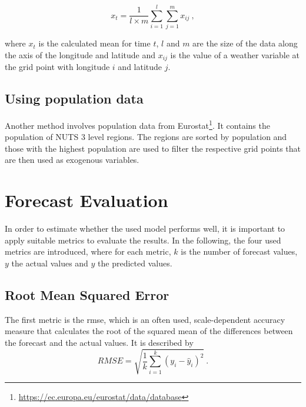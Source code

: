 \begin{equation}
x_t = \frac{1}{l \times m} \sum_{i=1}^{l}\sum_{j=1}^{m}x_{ij}~,
\end{equation}

where $x_t$ is the calculated mean for time $t$, $l$ and $m$ are the size of the data along the axis of the longitude and latitude and $x_{ij}$ is the value of a weather variable at the grid point with longitude $i$ and latitude $j$.

\subsection*{Using population data}

Another method involves population data from Eurostat\footnote{\url{https://ec.europa.eu/eurostat/data/database}}. It contains the population of NUTS 3 level regions. The regions are sorted by population and those with the highest population are used to filter the respective grid points that are then used as exogenous variables.\\


\section{Forecast Evaluation}
\label{sec:fceval}

In order to estimate whether the used model performs well, it is important to apply suitable metrics to evaluate the results. In the following, the four used metrics are introduced, where for each metric, $k$ is the number of forecast values, $y$ the actual values and $\hat{y}$ the predicted values.\\

\subsection*{Root Mean Squared Error}

The first metric is the \gls{rmse}, which is an often used, scale-dependent accuracy measure that calculates the root of the squared mean of the differences between the forecast and the actual values. It is described by\\

\begin{equation}
RMSE = \sqrt{\frac{1}{k} \sum_{i=1}^{k} (y_i-\hat{y}_i)^2}~.
\label{eq:rmse}
\end{equation}

